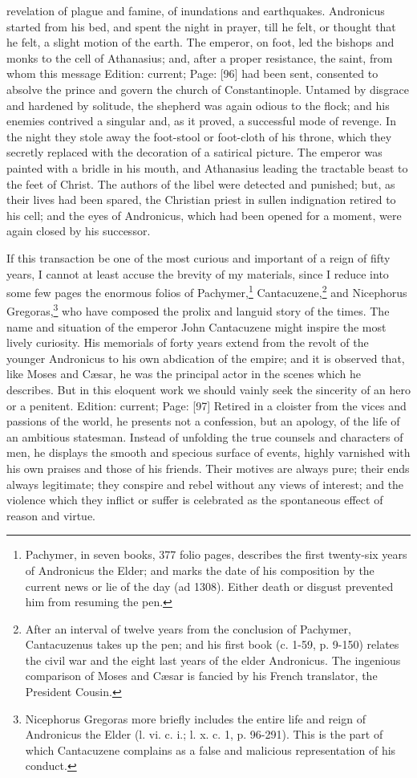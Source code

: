 revelation of plague and famine, of inundations and earthquakes. Andronicus started from his bed, and spent the night in prayer, till he felt, or thought that he felt, a slight motion of the earth. The emperor, on foot, led the bishops and monks to the cell of Athanasius; and, after a proper resistance, the saint, from whom this message Edition: current; Page: [96] had been sent, consented to absolve the prince and govern the church of Constantinople. Untamed by disgrace and hardened by solitude, the shepherd was again odious to the flock; and his enemies contrived a singular and, as it proved, a successful mode of revenge. In the night they stole away the foot-stool or foot-cloth of his throne, which they secretly replaced with the decoration of a satirical picture. The emperor was painted with a bridle in his mouth, and Athanasius leading the tractable beast to the feet of Christ. The authors of the libel were detected and punished; but, as their lives had been spared, the Christian priest in sullen indignation retired to his cell; and the eyes of Andronicus, which had been opened for a moment, were again closed by his successor.

If this transaction be one of the most curious and important of a reign of fifty years, I cannot at least accuse the brevity of my materials, since I reduce into some few pages the enormous folios of Pachymer,\footnote{Pachymer, in seven books, 377 folio pages, describes the first twenty-six years of Andronicus the Elder; and marks the date of his composition by the current news or lie of the day (ad 1308). Either death or disgust prevented him from resuming the pen.} Cantacuzene,\footnote{After an interval of twelve years from the conclusion of Pachymer, Cantacuzenus takes up the pen; and his first book (c. 1-59, p. 9-150) relates the civil war and the eight last years of the elder Andronicus. The ingenious comparison of Moses and Cæsar is fancied by his French translator, the President Cousin.} and Nicephorus Gregoras,\footnote{Nicephorus Gregoras more briefly includes the entire life and reign of Andronicus the Elder (l. vi. c. i.; l. x. c. 1, p. 96-291). This is the part of which Cantacuzene complains as a false and malicious representation of his conduct.} who have composed the prolix and languid story of the times. The name and situation of the emperor John Cantacuzene might inspire the most lively curiosity. His memorials of forty years extend from the revolt of the younger Andronicus to his own abdication of the empire; and it is observed that, like Moses and Cæsar, he was the principal actor in the scenes which he describes. But in this eloquent work we should vainly seek the sincerity of an hero or a penitent. Edition: current; Page: [97] Retired in a cloister from the vices and passions of the world, he presents not a confession, but an apology, of the life of an ambitious statesman. Instead of unfolding the true counsels and characters of men, he displays the smooth and specious surface of events, highly varnished with his own praises and those of his friends. Their motives are always pure; their ends always legitimate; they conspire and rebel without any views of interest; and the violence which they inflict or suffer is celebrated as the spontaneous effect of reason and virtue.

